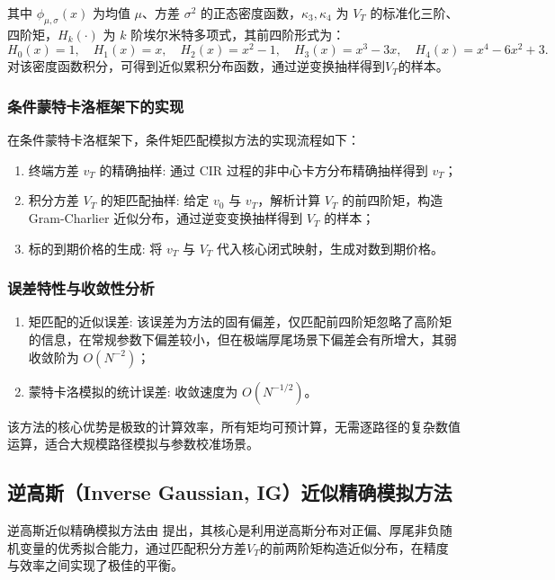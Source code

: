 其中 $\phi_{\mu,\sigma}(x)$ 为均值 $\mu$、方差 $\sigma^2$ 的正态密度函数，$\kappa_3, \kappa_4$ 为 $V_T$ 的标准化三阶、四阶矩，$H_k(\cdot)$ 为 $k$ 阶埃尔米特多项式，其前四阶形式为：
\begin {equation}
  H_0 (x) = 1, \quad H_1 (x) = x, \quad H_2 (x) = x^2 - 1, \quad H_3 (x) = x^3 - 3x, \quad H_4 (x) = x^4 - 6x^2 + 3.
\end {equation}
对该密度函数积分，可得到近似累积分布函数，通过逆变换抽样得到$V_T$的样本。

\subsubsection{条件蒙特卡洛框架下的实现}
在条件蒙特卡洛框架下，条件矩匹配模拟方法的实现流程如下：
\begin{enumerate}
    \item 终端方差 $v_T$ 的精确抽样: 通过 CIR 过程的非中心卡方分布精确抽样得到 $v_T$；

    \item 积分方差 $V_T$ 的矩匹配抽样: 给定 $v_0$ 与 $v_T$，解析计算 $V_T$ 的前四阶矩，构造 Gram-Charlier 近似分布，通过逆变变换抽样得到 $V_T$ 的样本；

    \item 标的到期价格的生成: 将 $v_T$ 与 $V_T$ 代入核心闭式映射，生成对数到期价格。
\end{enumerate}

\subsubsection{误差特性与收敛性分析}
\begin{enumerate}
    \item 矩匹配的近似误差: 该误差为方法的固有偏差，仅匹配前四阶矩忽略了高阶矩的信息，在常规参数下偏差较小，但在极端厚尾场景下偏差会有所增大，其弱收敛阶为 $O(N^{-2})$；

    \item 蒙特卡洛模拟的统计误差: 收敛速度为 $O(N^{-1/2})$。
\end{enumerate}
该方法的核心优势是极致的计算效率，所有矩均可预计算，无需逐路径的复杂数值运算，适合大规模路径模拟与参数校准场景。

\subsection{逆高斯（Inverse Gaussian, IG）近似精确模拟方法}
逆高斯近似精确模拟方法由 \citet{choiSimulationSchemesHeston2024} 提出，其核心是利用逆高斯分布对正偏、厚尾非负随机变量的优秀拟合能力，通过匹配积分方差$V_T$的前两阶矩构造近似分布，在精度与效率之间实现了极佳的平衡。
